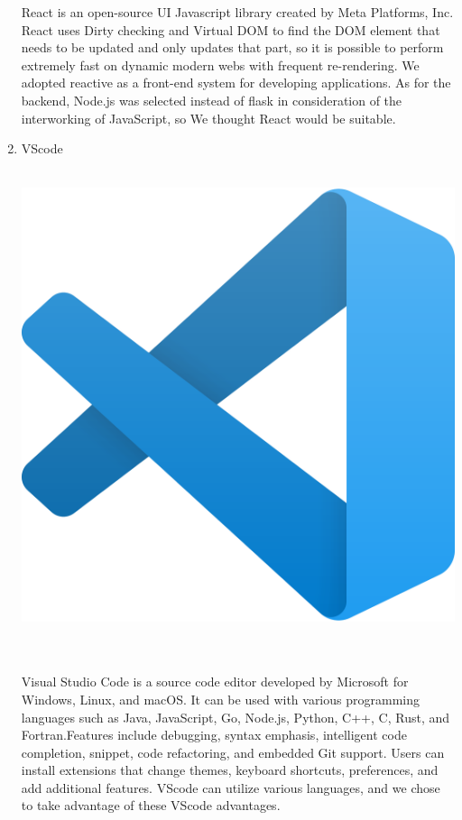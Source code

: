 \documentclass[conference]{IEEEtran}
\begin{document}
\begin{enumerate}
React is an open-source UI  Javascript library created by Meta Platforms, Inc. React uses Dirty checking and Virtual DOM to find the DOM element that needs to be updated and only updates that part, so it is possible to perform extremely fast on dynamic modern webs with frequent re-rendering. We adopted reactive as a front-end system for developing applications. As for the backend, Node.js was selected instead of flask in consideration of the interworking of JavaScript, so We thought React would be suitable.\\
	\item{VScode}\\
	\\
	\centerline{\includegraphics[scale=0.05]{pics/VScode.png}}\\\\
Visual Studio Code is a source code editor developed by Microsoft for Windows, Linux, and macOS. It can be used with various programming languages such as Java, JavaScript, Go, Node.js, Python, C++, C, Rust, and Fortran.Features include debugging, syntax emphasis, intelligent code completion, snippet, code refactoring, and embedded Git support. Users can install extensions that change themes, keyboard shortcuts, preferences, and add additional features. VScode can utilize various languages, and we chose to take advantage of these VScode advantages.\\

\end{enumerate}
\end{document}
